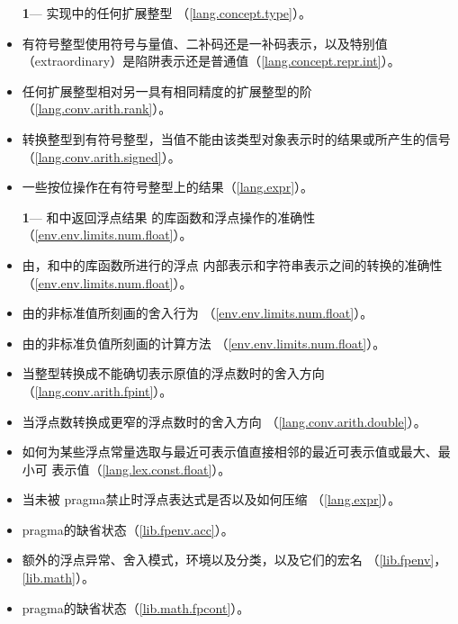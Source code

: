 \begin{itemize} %
  \item[\textbf{1}\hspace{5pt}---]{实现中的任何扩展整型
    （\ref{lang.concept.type}）。}
  \item{有符号整型使用符号与量值、二补码还是一补码表示，以及特别值
    （extraordinary）是陷阱表示还是普通值（\ref{lang.concept.repr.int}）。}
  \item{任何扩展整型相对另一具有相同精度的扩展整型的阶
    （\ref{lang.conv.arith.rank}）。}
  \item{转换整型到有符号整型，当值不能由该类型对象表示时的结果或所产生的信号
    （\ref{lang.conv.arith.signed}）。}
  \item{一些按位操作在有符号整型上的结果（\ref{lang.expr}）。}
\end{itemize}

\begin{itemize} %
  \item[\textbf{1}\hspace{5pt}---]{和中返回浮点结果
    的库函数和浮点操作的准确性（\ref{env.env.limits.num.float}）。}
  \item{由，和中的库函数所进行的浮点
    内部表示和字符串表示之间的转换的准确性（\ref{env.env.limits.num.float}）。}
  \item{由的非标准值所刻画的舍入行为
    （\ref{env.env.limits.num.float}）。}
  \item{由的非标准负值所刻画的计算方法
    （\ref{env.env.limits.num.float}）。}
  \item{当整型转换成不能确切表示原值的浮点数时的舍入方向
    （\ref{lang.conv.arith.fpint}）。}
  \item{当浮点数转换成更窄的浮点数时的舍入方向
    （\ref{lang.conv.arith.double}）。}
  \item{如何为某些浮点常量选取与最近可表示值直接相邻的最近可表示值或最大、最小可
    表示值（\ref{lang.lex.const.float}）。}
  \item{当未被 pragma禁止时浮点表达式是否以及如何压缩
    （\ref{lang.expr}）。}
  \item{ pragma的缺省状态（\ref{lib.fpenv.acc}）。}
  \item{额外的浮点异常、舍入模式，环境以及分类，以及它们的宏名
    （\ref{lib.fpenv}，\ref{lib.math}）。}
  \item{ pragma的缺省状态（\ref{lib.math.fpcont}）。}
\end{itemize}


